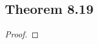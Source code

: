 \documentclass[../../main.tex]{subfiles}
\begin{document}
\subsection{Theorem 8.19}
\begin{wts}

\end{wts}
\begin{proof}

\end{proof}
\end{document}
